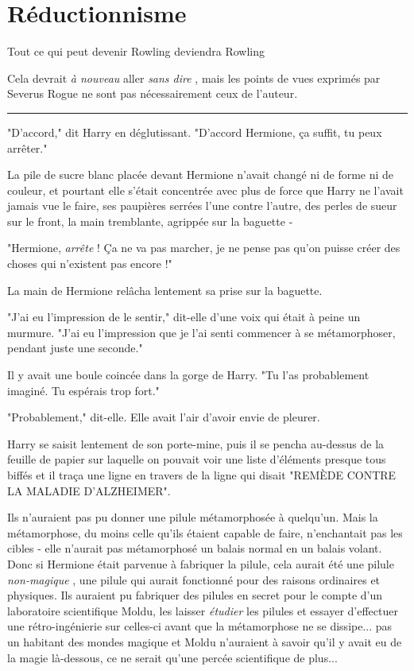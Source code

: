 
\chapter{Réductionnisme}

Tout ce qui peut devenir Rowling deviendra Rowling

Cela devrait \emph{à nouveau}  aller \emph{sans dire} , mais les points de vues exprimés par Severus Rogue ne sont pas nécessairement ceux de l'auteur.
\par\noindent\rule{\textwidth}{0.4pt}
"D'accord," dit Harry en déglutissant. "D'accord Hermione, ça suffit, tu peux arrêter."

La pile de sucre blanc placée devant Hermione n'avait changé ni de forme ni de couleur, et pourtant elle s'était concentrée avec plus de force que Harry ne l'avait jamais vue le faire, ses paupières serrées l'une contre l'autre, des perles de sueur sur le front, la main tremblante, agrippée sur la baguette -

"Hermione, \emph{arrête}  ! Ça ne va pas marcher, je ne pense pas qu'on puisse créer des choses qui n'existent pas encore !"

La main de Hermione relâcha lentement sa prise sur la baguette.

"J'ai eu l'impression de le sentir," dit-elle d'une voix qui était à peine un murmure. "J'ai eu l'impression que je l'ai senti commencer à se métamorphoser, pendant juste une seconde."

Il y avait une boule coincée dans la gorge de Harry. "Tu l'as probablement imaginé. Tu espérais trop fort."

"Probablement," dit-elle. Elle avait l'air d'avoir envie de pleurer.

Harry se saisit lentement de son porte-mine, puis il se pencha au-dessus de la feuille de papier sur laquelle on pouvait voir une liste d'éléments presque tous biffés et il traça une ligne en travers de la ligne qui disait "REMÈDE CONTRE LA MALADIE D'ALZHEIMER".

Ils n'auraient pas pu donner une pilule métamorphosée à quelqu'un. Mais la métamorphose, du moins celle qu'ils étaient capable de faire, n'enchantait pas les cibles - elle n'aurait pas métamorphosé un balais normal en un balais volant. Donc si Hermione était parvenue à fabriquer la pilule, cela aurait été une pilule \emph{non-magique} , une pilule qui aurait fonctionné pour des raisons ordinaires et physiques. Ils auraient pu fabriquer des pilules en secret pour le compte d'un laboratoire scientifique Moldu, les laisser \emph{étudier}  les pilules et essayer d'effectuer une rétro-ingénierie sur celles-ci avant que la métamorphose ne se dissipe... pas un habitant des mondes magique et Moldu n'auraient à savoir qu'il y avait eu de la magie là-dessous, ce ne serait qu'une percée scientifique de plus...

